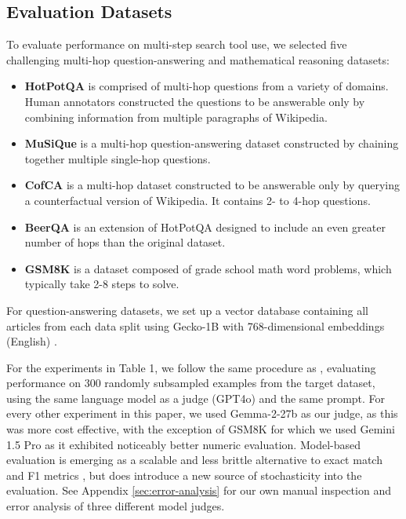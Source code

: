 \documentclass{article} %
\begin{document}
\subsection{Evaluation Datasets}
To evaluate performance on multi-step search tool use, we selected five challenging multi-hop question-answering and mathematical reasoning datasets:

\begin{itemize}
    \item \noindent\textbf{HotPotQA} \citep{yang2018hotpotqadatasetdiverseexplainable} is comprised of multi-hop questions from a variety of domains. Human annotators constructed the questions to be answerable only by combining information from multiple paragraphs of Wikipedia.
    \item \noindent\textbf{MuSiQue}  \citep{trivedi2022musiquemultihopquestionssinglehop} is a multi-hop question-answering dataset constructed by chaining together multiple single-hop questions.
    \item \noindent\textbf{CofCA} \citep{wu2024cofcastepwisecounterfactualmultihop} is a multi-hop dataset constructed to be answerable only by querying a counterfactual version of Wikipedia. It contains 2- to 4-hop questions.
    \item \noindent\textbf{BeerQA}  \citep{qi2021answeringopendomainquestionsvarying} is an extension of HotPotQA designed to include an even greater number of hops than the original dataset. 
    \item \noindent\textbf{GSM8K} \citep{gsm8k2021} is a dataset composed of grade school math word problems, which typically take 2-8 steps to solve.
\end{itemize}

For question-answering datasets, we set up a vector database containing all articles from each data split using Gecko-1B with 768-dimensional embeddings (English) \citep{lee2024geckoversatiletextembeddings}.

For the experiments in Table 1, we follow the same procedure as \cite{wu2024cofcastepwisecounterfactualmultihop}, evaluating performance on 300 randomly subsampled examples from the target dataset, using the same language model as a judge (GPT4o) and the same prompt. For every other experiment in this paper, we used Gemma-2-27b as our judge, as this was more cost effective, with the exception of GSM8K for which we used Gemini 1.5 Pro as it exhibited noticeably better numeric evaluation. Model-based evaluation is emerging as a scalable and less brittle alternative to exact match and F1 metrics \citep{zheng2023judgingllmasajudgemtbenchchatbot, gu2025surveyllmasajudge}, but does introduce a new source of stochasticity into the evaluation. See Appendix \ref{sec:error-analysis} for our own manual inspection and error analysis of three different model judges.
\end{document}
